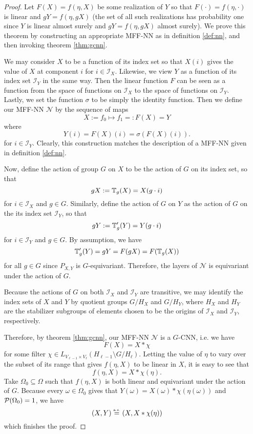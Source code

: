 \documentclass[10pt]{article}
\begin{document}
\begin{proof}
Let $F(X) = f(\eta, X)$ be some realization of $Y$ so that $F(\cdot) = f(\eta, \cdot)$ is linear and $gY = f(\eta,gX)$ (the set of all such realizations has probability one since $Y$ is linear almost surely and $gY = f(\eta,gX)$ almost surely).
We prove this theorem by constructing an appropriate MFF-NN as in definition \ref{def:nn}, and then invoking theorem \ref{thm:gcnn}.

We may consider $X$ to be a function of its index set so that $X(i)$ gives the value of $X$ at component $i$ for $i \in \mathcal{I}_X$.
Likewise, we view $Y$ as a function of its index set $\mathcal{I}_{Y}$ in the same way.
Then the linear function $F$ can be seen as a function from the space of functions on $\mathcal{I}_{X}$ to the space of functions on $\mathcal{I}_Y$.
Lastly, we set the function $\sigma$ to be simply the identity function.
Then we define our MFF-NN $\mathcal{N}$ by the sequence of maps
$$
	X := f_0 \mapsto f_1 =: F(X) = Y
$$
where
$$
	Y(i) = F(X)(i) = \sigma(F(X)(i)).
$$
for $i \in \mathcal{I}_Y$.
Clearly, this construction matches the description of a MFF-NN given in definition \ref{def:nn}.

Now, define the action of group $G$ on $X$ to be the action of $G$ on its index set, so that
$$
	gX := \bbT_g(X) = X(g\cdot i)
$$
for $i \in \mathcal{I}_{X}$ and $g \in G$.
Similarly, define the action of $G$ on $Y$ as the action of $G$ on the its index set $\mathcal{I}_Y$, so that
$$
	gY := \bbT'_g(Y) = Y(g \cdot i)
$$
for $i \in \mathcal{I}_{Y}$ and $g \in G$.
By assumption, we have
$$
	\bbT'_g(Y) = gY = F(gX) = F(\bbT_g(X))
$$
for all $g \in G$ since $P_{X,Y}$ is $G$-equivariant.
Therefore, the layers of $\mathcal{N}$ is equivariant under the action of $G$.

Because the actions of $G$ on both $\mathcal{I}_{X}$ and $\mathcal{I}_{Y}$ are transitive, we may identify the index sets of $X$ and $Y$ by quotient groups $G/H_X$ and $G/H_Y$, where $H_X$ and $H_Y$ are the stabilizer subgroups of elements chosen to be the origins of $\mathcal{I}_X$ and $\mathcal{I}_Y$, respectively.

Therefore, by theorem \ref{thm:gcnn}, our MFF-NN $\mathcal{N}$ is a $G$-CNN, i.e. we have
$$
	F(X) = X * \chi
$$
for some filter $\chi \in L_{V_{\ell-1} \times V_{\ell}}(H_{\ell-1} \setminus G / H_{\ell})$.
Letting the value of $\eta$ to vary over the subset of its range that gives $f(\eta,X)$ to be linear in $X$, it is easy to see that
$$
	f(\eta,X) = X * \chi(\eta).
$$
Take $\Omega_0 \subseteq \Omega$ such that $f(\eta,X)$ is both linear and equivariant under the action of $G$.
Because every $\omega \in \Omega_0$ gives that $Y(\omega) = X(\omega) * \chi(\eta(\omega))$ and $\P(\Omega_0) = 1$, we have
$$
	(X,Y) \equas (X,X * \chi(\eta))
$$
which finishes the proof.
\end{proof}



\clearpage
\appendix





\printbibliography
\end{document}
